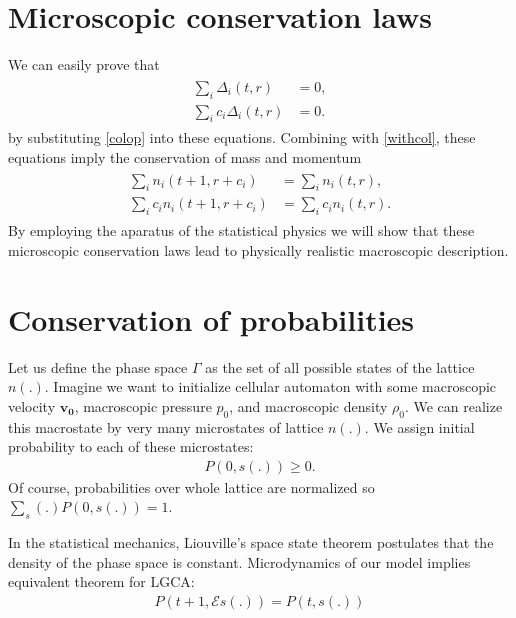 \section{Microscopic conservation laws}
We can easily prove that
\begin{align*}
\begin{split}
\sum_i \Delta_i(t,r) &= 0,\\
\sum_i c_i \Delta_i(t,r) &= 0.
\end{split}
\end{align*}
by substituting \ref{colop} into these equations. Combining with \ref{withcol}, these equations imply the conservation of mass and momentum
\begin{align} \label{cons1}
\begin{split}
\sum_i n_i(t+1, r + c_i) &= \sum_i n_i(t,r), \\
\sum_i c_i n_i(t+1, r + c_i) &= \sum_i c_i n_i(t,r).
\end{split}
\end{align}
By employing the aparatus of the statistical physics we will show that these microscopic conservation laws lead to physically realistic macroscopic description.

\section{Conservation of probabilities}
Let us define the phase space $\Gamma$ as the set of all possible states of the lattice $n(.)$.
Imagine we want to initialize cellular automaton with some macroscopic velocity $\bm{v_0}$, macroscopic pressure $p_0$, and macroscopic density $\rho_0$.
We can realize this macrostate by very many microstates of lattice $n(.)$.
We assign initial probability to each of these microstates:
\begin{align*}
P(0,s(.)) \geq 0.
\end{align*}
Of course, probabilities over whole lattice are normalized so
$\sum_s(.) P(0,s(.)) = 1$.

In the statistical mechanics, Liouville's space state theorem postulates that the density of the phase space is constant. Microdynamics of our model implies equivalent theorem for LGCA:
\begin{align*}
P(t+1, \mathcal{E} s(.)) = P(t, s(.))
\end{align*}

